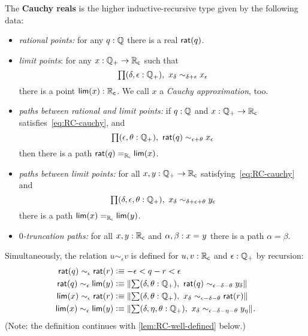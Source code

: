\begin{defn}\label{defn:cauchy-reals}
  The \textbf{Cauchy reals \RC} is the higher inductive-recursive type given by the
  following data:
  \begin{itemize}
  \item \emph{rational points:} 
    for any $q : \Q$ there is a real $\rcrat(q)$.
  \item \emph{limit points}:
    for any $x : \Qp \to \RC$ such that
    \begin{equation}
      \label{eq:RC-cauchy}
      \prd{\delta, \epsilon : \Qp} x_\delta \sim_{\delta + \epsilon} x_\epsilon
    \end{equation}
    there is a point $\rclim(x) : \RC$. We call $x$ a \emph{Cauchy approximation}, too.
  \item \emph{paths between rational and limit points:}
    if $q : \Q$ and $x : \Qp \to \RC$ satisfies~\eqref{eq:RC-cauchy}, and
    \begin{equation}
      \label{eq:RC-rat-eq-lim}
      \prd{\epsilon, \theta : \Qp} \rcrat(q) \sim_{\epsilon + \theta} x_\epsilon
    \end{equation}
    then there is a path $\id[\RC]{\rcrat(q)}{\rclim(x)}$.
  \item \emph{paths between limit points:}
    for all $x, y : \Qp \to \RC$ satisfying~\eqref{eq:RC-cauchy} and
    \begin{equation}
      \label{eq:RC-lim-eq-lim}
      \prd{\delta, \epsilon, \theta : \Qp} x_\delta \sim_{\delta + \epsilon + \theta} y_\epsilon
    \end{equation}
    there is a path $\id[\RC]{\rclim(x)}{\rclim(y)}$.
  \item \emph{$0$-truncation paths:} for all $x, y : \RC$ and $\alpha, \beta : \id{x}{y}$
    there is a path $\alpha = \beta$.
  \end{itemize}
  Simultaneously, the relation $u \sim_\epsilon v$ is defined for $u, v : \RC$ and
  $\epsilon : \Qp$ by recursion:
  \begin{align*}
    \rcrat(q) \sim_\epsilon \rcrat(r)  &\defeq
    -\epsilon < q - r < \epsilon
    \\
    \rcrat(q) \sim_\epsilon \rclim(y) &\defeq
    \brck{\sm{\delta, \theta : \Qp} \rcrat(q) \sim_{\epsilon - \delta - \theta} y_\delta}
    \\
    \rclim(x) \sim_\epsilon \rcrat(r) &\defeq
    \brck{\sm{\delta, \theta : \Qp} x_\delta \sim_{\epsilon - \delta - \theta} \rcrat(r)}
    \\
    \rclim(x) \sim_\epsilon \rclim(y) &\defeq
    \brck{\sm{\delta, \eta, \theta : \Qp} x_\delta \sim_{\epsilon - \delta - \eta - \theta} y_\eta}.
  \end{align*}  
  (Note: the definition continues with \autoref{lem:RC-well-defined} below.)
\end{defn}

